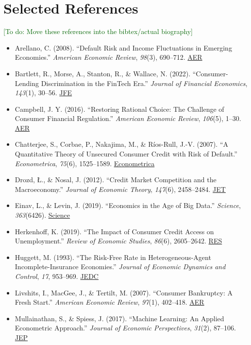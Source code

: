 \documentclass[acmsmall]{acmart}
\newcommand{\todo}[1]{\textcolor{DarkGreen}{[To do: #1]}}
\begin{document}
\section*{Selected References}
\todo{Move these references into the bibtex/actual biography}
\begin{itemize}
    \item Arellano, C. (2008). “Default Risk and Income Fluctuations in Emerging Economies.” \textit{American Economic Review}, \textit{98}(3), 690–712. \href{https://www.aeaweb.org/articles?id=10.1257/aer.98.3.690}{AER}
    \item Bartlett, R., Morse, A., Stanton, R., \& Wallace, N. (2022). “Consumer-Lending Discrimination in the FinTech Era.” \textit{Journal of Financial Economics}, \textit{143}(1), 30–56. \href{https://www.sciencedirect.com/science/article/pii/S0304405X2100212X}{JFE}
    \item Campbell, J. Y. (2016). “Restoring Rational Choice: The Challenge of Consumer Financial Regulation.” \textit{American Economic Review}, \textit{106}(5), 1–30. \href{https://www.aeaweb.org/articles?id=10.1257/aer.20151213}{AER}
    \item Chatterjee, S., Corbae, P., Nakajima, M., \& Ríos-Rull, J.-V. (2007). “A Quantitative Theory of Unsecured Consumer Credit with Risk of Default.” \textit{Econometrica}, \textit{75}(6), 1525–1589. \href{https://www.econometricsociety.org/publications/econometrica/1999/09/01/quantitative-theory-unsecured-consumer-credit-risk-default}{Econometrica}
    \item Drozd, Ł., \& Nosal, J. (2012). “Credit Market Competition and the Macroeconomy.” \textit{Journal of Economic Theory}, \textit{147}(6), 2458–2484. \href{https://www.sciencedirect.com/science/article/pii/S002205311200082X}{JET}
    \item Einav, L., \& Levin, J. (2019). “Economics in the Age of Big Data.” \textit{Science}, \textit{363}(6426). \href{https://www.science.org/doi/10.1126/science.aav8198}{Science}
    \item Herkenhoff, K. (2019). “The Impact of Consumer Credit Access on Unemployment.” \textit{Review of Economic Studies}, \textit{86}(6), 2605–2642. \href{https://academic.oup.com/restud/article-abstract/86/6/2605/5489438}{RES}
    \item Huggett, M. (1993). “The Risk-Free Rate in Heterogeneous-Agent Incomplete-Insurance Economies.” \textit{Journal of Economic Dynamics and Control}, \textit{17}, 953–969. \href{https://www.sciencedirect.com/science/article/pii/0165188993900407}{JEDC}
    \item Livshits, I., MacGee, J., \& Tertilt, M. (2007). “Consumer Bankruptcy: A Fresh Start.” \textit{American Economic Review}, \textit{97}(1), 402–418. \href{https://www.aeaweb.org/articles?id=10.1257/aer.97.1.402}{AER}
    \item Mullainathan, S., \& Spiess, J. (2017). “Machine Learning: An Applied Econometric Approach.” \textit{Journal of Economic Perspectives}, \textit{31}(2), 87–106. \href{https://www.aeaweb.org/articles?id=10.1257/jep.31.2.87}{JEP}
\end{itemize}




\end{document}
